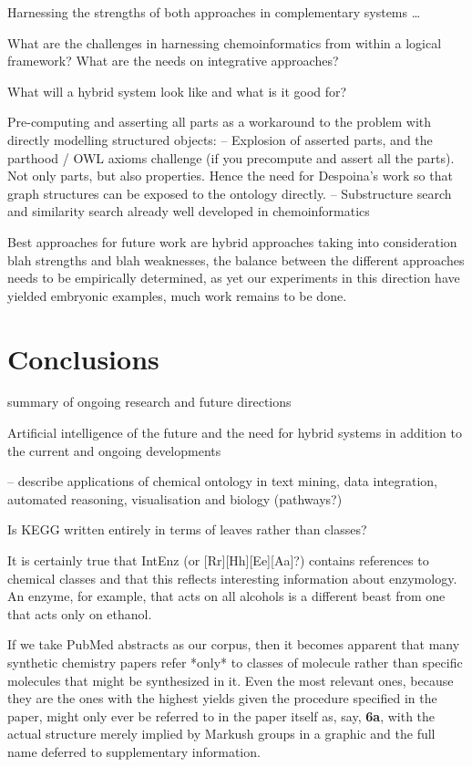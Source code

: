 \documentclass[10pt]{bmc_article}
\newenvironment{bmcformat}{\baselineskip20pt\sloppy\setboolean{publ}{false}}{\baselineskip20pt\sloppy}
\begin{document}
\begin{bmcformat}
Harnessing the strengths of both approaches in complementary systems \ldots

What are the challenges in harnessing chemoinformatics from within a logical framework?  What are the needs on integrative approaches?

What will a hybrid system look like and what is it good for? 


Pre-computing and asserting all parts as a workaround to the problem with directly modelling structured objects: 
-- Explosion of asserted parts, and the parthood / OWL axioms challenge (if you precompute and assert all the parts). Not only parts, but also properties. Hence the need for Despoina's work so that graph structures can be exposed to the ontology directly. 
-- Substructure search and similarity search already well developed in chemoinformatics 


Best approaches for future work are hybrid approaches taking into consideration blah strengths and blah weaknesses, the balance between the different approaches needs to be empirically determined, as yet our experiments in this direction have yielded embryonic examples, much work remains to be done. 




\section*{Conclusions}

summary of ongoing research and future directions

Artificial intelligence of the future and the need for hybrid systems in addition to the current and ongoing developments 


-- describe applications of chemical ontology in text mining, data integration, automated reasoning, visualisation and biology (pathways?)

Is KEGG written entirely in terms of leaves rather than classes? 

It is certainly true that IntEnz (or [Rr][Hh][Ee][Aa]?) contains references to chemical classes and that this reflects interesting information about enzymology.
An enzyme, for example, that acts on all alcohols is a different beast from one that acts only on ethanol.

If we take PubMed abstracts as our corpus, then it becomes apparent that many synthetic chemistry papers refer *only* to classes of molecule rather than specific molecules that might be synthesized in it.  Even the most relevant ones, because they are the ones with the highest yields given the procedure specified in the paper, might only ever be referred to in the paper itself as, say, \textbf{6a}, with the actual structure merely implied by Markush groups in a graphic and the full name deferred to supplementary information.


\end{bmcformat}
\end{document}
